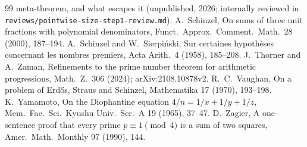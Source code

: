 \documentclass[11pt,reqno]{amsart}
\theoremstyle{definition}
\begin{document}
{\begin{thebibliography}{99}
meta-theorem, and what escapes it (unpublished, 2026; internally reviewed
in \texttt{reviews/pointwise-size-step1-review.md}).
 A.~Schinzel, On sums of three unit fractions with
polynomial denominators, Funct.\ Approx.\ Comment.\ Math.\ 28 (2000),
187--194.
 A.~Schinzel and W.~Sierpi\'nski, Sur certaines hypoth\`eses
concernant les nombres premiers, Acta Arith.\ 4 (1958), 185--208.
 J.~Thorner and A.~Zaman, Refinements to the prime number
theorem for arithmetic progressions, Math.\ Z.\ 306 (2024);
arXiv:2108.10878v2.
 R.~C.~Vaughan, On a problem of Erd\H{o}s, Straus and
Schinzel, Mathematika 17 (1970), 193--198.
 K.~Yamamoto, On the Diophantine equation
$4/n=1/x+1/y+1/z$, Mem.\ Fac.\ Sci.\ Kyushu Univ.\ Ser.\ A 19 (1965), 37--47.
 D.~Zagier, A one-sentence proof that every prime
$p\equiv1\pmod4$ is a sum of two squares, Amer.\ Math.\ Monthly 97 (1990),
144.
\end{thebibliography}
\par}
\end{document}
